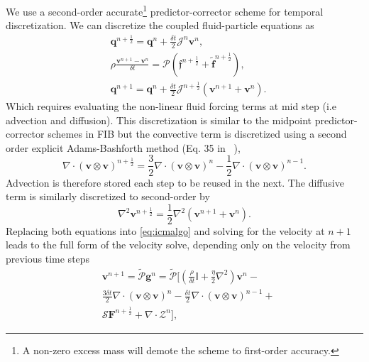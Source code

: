 \documentclass[ twoside,openright,titlepage,numbers=noenddot,%
headinclude,footinclude,cleardoublepage=empty,abstract=on,
BCOR=5mm,paper=b5,fontsize=11pt, dvipsnames
]{scrreprt}
\renewcommand{\vec}[1]{\bm{#1}}
\newcommand{\oper}[1]{\mathcal{#1}}
\newcommand{\dt}{\delta t}
\newcommand{\half}{\frac{1}{2}}
\newcommand{\ppos}{q}
\newcommand{\fvel}{v}
\begin{document}
We use a second-order accurate\footnote{A non-zero excess mass will demote the scheme to first-order accuracy.} predictor-corrector scheme for temporal discretization. We can discretize the coupled fluid-particle equations as
\begin{equation}
  \label{eq:icmalgo}
  \begin{aligned}
    &\vec{\ppos}^{n+\half} = \vec{\ppos}^n + \frac{\dt}{2}\oper{J}^n\vec{\fvel}^n,\\
    &\rho\frac{\vec{\fvel}^{n+1} - \vec{\fvel}^n}{\dt} = \oper{P}\left(\vec{\mathfrak{f}}^{n+\half} + \tilde{\vec{f}}^{n+\half} \right),\\
    &\vec{\ppos}^{n+1} = \vec{\ppos}^n + \frac{\dt}{2}\oper{J}^{n+\half}\left(\vec{\fvel}^{n+1} + \vec{\fvel}^{n}\right).
  \end{aligned}
\end{equation}
Which requires evaluating the non-linear fluid forcing terms at mid step (i.e advection and diffusion).
This discretization is similar to the midpoint predictor-corrector schemes in \gls{FIB} but the convective term is discretized using a second order explicit Adams-Bashforth method (Eq. 35 in ~\cite{Balboa2014}),
\begin{equation}
  \nabla\cdot (\vec{\fvel}\otimes\vec{\fvel})^{n+\half} = \frac{3}{2} \nabla\cdot (\vec{\fvel}\otimes\vec{\fvel})^n - \half \nabla\cdot (\vec{\fvel}\otimes\vec{\fvel})^{n-1}.
\end{equation}
Advection is therefore stored each step to be reused in the next.
The diffusive term is similarly discretized to second-order by
\begin{equation}
  \nabla^2\vec{\fvel}^{n+\half} = \half\nabla^2\left(\vec{\fvel}^{n+1} + \vec{\fvel}^{n}\right).
\end{equation}
Replacing both equations into \eqref{eq:icmalgo} and solving for the velocity at $n+1$ leads to the full form of the velocity solve, depending only on the velocity from previous time steps
\begin{equation}
  \label{eq:icmfluidvel}
  \begin{aligned}
    &\vec{\fvel}^{n+1} = \tilde{\oper{P}}\vec{g}^n =\tilde{\oper{P}}\Big[    \left(\frac{\rho}{\dt}\mathbb{I} + \frac{\eta}{2}\nabla^2\right)\vec{\fvel}^n- \\
    & \frac{3\dt}{2} \nabla\cdot (\vec{\fvel}\otimes\vec{\fvel})^n - \frac{\dt}{2} \nabla\cdot (\vec{\fvel}\otimes\vec{\fvel})^{n-1}+\\
    &\oper{S}\vec{F}^{n+\half} + \nabla\cdot\mathcal{Z}^n \Big],
  \end{aligned}
\end{equation}
\end{document}
